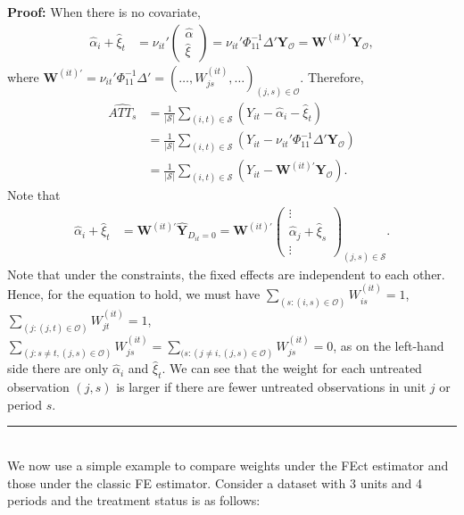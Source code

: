 \documentclass[12pt]{article}
\newenvironment{proof}[1][Proof]{\noindent\textbf{#1:} }{\  \rule{0.5em}{0.5em}}
\begin{document}
\begin{proof} When there is no covariate,
\begin{align*}
\hat\alpha_{i} + \hat\xi_{t} & = \nu_{it}' \begin{pmatrix}
  \hat{\alpha} \\
  \hat{\xi}
\end{pmatrix} = \nu_{it}' \Phi^{-1}_{11} \Delta' \mathbf{Y}_{\mathcal{O}} = \mathbf{W}^{(it)'} \mathbf{Y}_{\mathcal{O}},
\end{align*}
where $\mathbf{W}^{(it)'}  = \nu_{it}' \Phi^{-1}_{11} \Delta' = \left(\dots, W_{js}^{(it)}, \dots\right)_{(j,s) \in \mathcal{O}}$.
Therefore,
\begin{align*}
    \widehat{ATT_{s}} & = \frac{1}{|\mathcal{S}|}
                        \sum_{(i,t) \in \mathcal{S}} \left( Y_{it} - \hat       
                       \alpha_{i} - \hat\xi_{t} \right) \\
                      & = \frac{1}{|\mathcal{S}|}
                        \sum_{(i,t) \in \mathcal{S}} \left( Y_{it} - \nu_{it}' \Phi^{-1}_{11} \Delta' \mathbf{Y}_{\mathcal{O}} \right) \\
                        & = \frac{1}{|\mathcal{S}|}
                        \sum_{(i,t) \in \mathcal{S}} (Y_{it} -  \mathbf{W}^{(it)'} \mathbf{Y}_{\mathcal{O}}).
  \end{align*}
Note that 
\begin{align*}
\hat\alpha_{i} + \hat\xi_{t} & = \mathbf{W}^{(it)'} \hat{\mathbf{Y}}_{D_{it} = 0} =\mathbf{W}^{(it)'} \begin{pmatrix}
 \vdots \\
  \hat{\alpha}_j + \hat{\xi}_s \\
  \vdots
\end{pmatrix}_{(j,s) \in \mathcal{S}}.
\end{align*}
Note that under the constraints, the fixed effects are independent to each other. Hence, for the equation to hold, we must have $\sum_{(s: (i, s)\in\mathcal{O})}W_{is}^{(it)} = 1$,  $\sum_{(j: (j, t)\in\mathcal{O})}W_{jt}^{(it)} = 1$, $\sum_{(j: s \neq t, (j, s)\in\mathcal{O})}W_{js}^{(it)} = \sum_{(s: (j \neq i, (j, s)\in\mathcal{O})}W_{js}^{(it)} = 0$, as on the left-hand side there are only $\hat\alpha_{i}$ and $\hat\xi_{t}$. We can see that the weight for each untreated observation $(j, s)$ is larger if there are fewer untreated observations in unit $j$ or period $s$. 
\end{proof} \\

We now use a simple example to compare weights under the FEct estimator and those under the classic FE estimator. Consider a dataset with 3 units and 4 periods and the treatment status is as follows: 
\end{document}
